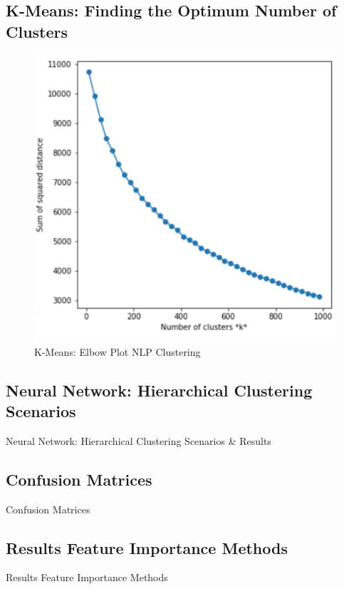 \subsection{K-Means: Finding the Optimum Number of Clusters}
\label{ssec:Kmeans}
\begin{figure}[h]
    \centering
    \includegraphics[width=.4\linewidth]{ThesisTemplate/Images/K-means.png}
    \caption{K-Means: Elbow Plot NLP Clustering}
\end{figure}

\subsection{Neural Network: Hierarchical Clustering Scenarios}
\label{ssec:hieclu}
\begin{table}[H]
\begin{footnotesize}

\end{footnotesize}
\caption{\label{tab:hieclu} Neural Network: Hierarchical Clustering Scenarios \& Results}
\end{table}

\subsection{Confusion Matrices}
\label{ssec:cm}
\begin{table}[H]
\begin{footnotesize}

\end{footnotesize}
\caption{\label{tab:cm} Confusion Matrices}
\end{table}

\subsection{Results Feature Importance Methods}
\label{ssec:fi}
\begin{table}[H]
\begin{footnotesize}

\end{footnotesize}
\caption{\label{tab:fi} Results Feature Importance Methods}
\end{table}

